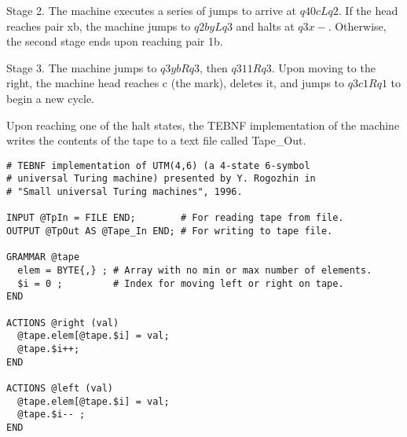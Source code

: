 \indent 
Stage 2.  The machine executes a series of jumps to arrive at $q40cLq2$.  If the head reaches pair xb, the machine jumps to $q2byLq3$ and halts at $q3x-$.  Otherwise, the second stage ends upon reaching pair 1b.

\indent
Stage 3.  The machine jumps to $q3ybRq3$, then $q311Rq3$.  Upon moving to the right, the machine head reaches c (the mark), deletes it, and jumps to $q3c1Rq1$  to begin a new cycle.

\indent
Upon reaching one of the halt states, the TEBNF implementation of the machine writes the contents of the tape to a text file called Tape\_Out. 

\begin{lstlisting}[basicstyle=\small,caption={Rogozhin's UTM(4,6) implemented in TEBNF.},label=ExampleUTM46]
# TEBNF implementation of UTM(4,6) (a 4-state 6-symbol
# universal Turing machine) presented by Y. Rogozhin in
# "Small universal Turing machines", 1996.

INPUT @TpIn = FILE END;        # For reading tape from file.
OUTPUT @TpOut AS @Tape_In END; # For writing to tape file.

GRAMMAR @tape
  elem = BYTE{,} ; # Array with no min or max number of elements.
  $i = 0 ;         # Index for moving left or right on tape.
END

ACTIONS @right (val)
  @tape.elem[@tape.$i] = val;
  @tape.$i++;
END

ACTIONS @left (val)
  @tape.elem[@tape.$i] = val;
  @tape.$i-- ;
END


\end{lstlisting}
